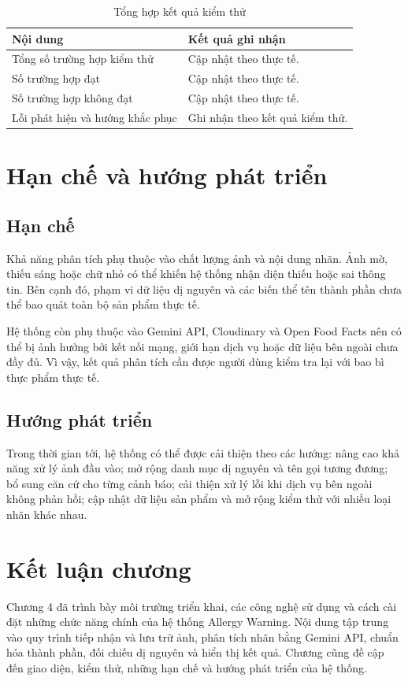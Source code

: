 \begin{table}[htbp]
	\centering
	\caption{Tổng hợp kết quả kiểm thử}
	\label{tab:ch4-test-summary}
	\small
	\renewcommand{\arraystretch}{1.2}
	\begin{tabularx}{0.9\textwidth}{|>{\raggedright\arraybackslash}p{5cm}|>{\raggedright\arraybackslash}X|}
		\hline
		\textbf{Nội dung} & \textbf{Kết quả ghi nhận} \\ \hline
		Tổng số trường hợp kiểm thử & Cập nhật theo thực tế. \\ \hline
		Số trường hợp đạt & Cập nhật theo thực tế. \\ \hline
		Số trường hợp không đạt & Cập nhật theo thực tế. \\ \hline
		Lỗi phát hiện và hướng khắc phục & Ghi nhận theo kết quả kiểm thử. \\ \hline
	\end{tabularx}
\end{table}

\section{Hạn chế và hướng phát triển}

\subsection{Hạn chế}

Khả năng phân tích phụ thuộc vào chất lượng ảnh và nội dung nhãn. Ảnh mờ, thiếu sáng hoặc chữ nhỏ có thể khiến hệ thống nhận diện thiếu hoặc sai thông tin. Bên cạnh đó, phạm vi dữ liệu dị nguyên và các biến thể tên thành phần chưa thể bao quát toàn bộ sản phẩm thực tế.

Hệ thống còn phụ thuộc vào Gemini API, Cloudinary và Open Food Facts nên có thể bị ảnh hưởng bởi kết nối mạng, giới hạn dịch vụ hoặc dữ liệu bên ngoài chưa đầy đủ. Vì vậy, kết quả phân tích cần được người dùng kiểm tra lại với bao bì thực phẩm thực tế.

\subsection{Hướng phát triển}

Trong thời gian tới, hệ thống có thể được cải thiện theo các hướng: nâng cao khả năng xử lý ảnh đầu vào; mở rộng danh mục dị nguyên và tên gọi tương đương; bổ sung căn cứ cho từng cảnh báo; cải thiện xử lý lỗi khi dịch vụ bên ngoài không phản hồi; cập nhật dữ liệu sản phẩm và mở rộng kiểm thử với nhiều loại nhãn khác nhau.

\section{Kết luận chương}

Chương 4 đã trình bày môi trường triển khai, các công nghệ sử dụng và cách cài đặt những chức năng chính của hệ thống Allergy Warning. Nội dung tập trung vào quy trình tiếp nhận và lưu trữ ảnh, phân tích nhãn bằng Gemini API, chuẩn hóa thành phần, đối chiếu dị nguyên và hiển thị kết quả. Chương cũng đề cập đến giao diện, kiểm thử, những hạn chế và hướng phát triển của hệ thống.
